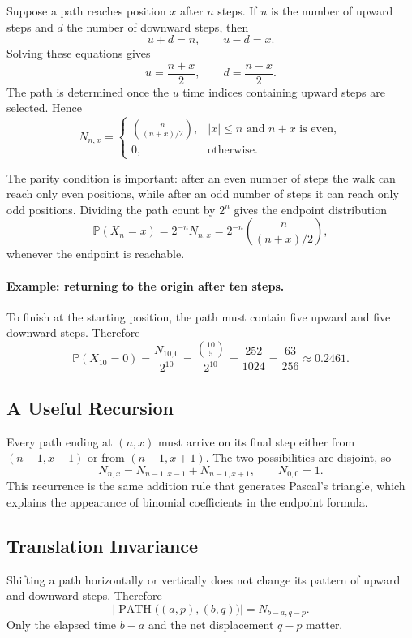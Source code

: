 \documentclass[12pt,openany]{book}
\theoremstyle{definition}
\theoremstyle{remark}
\begin{document}
Suppose a path reaches position \(x\) after \(n\) steps. If \(u\) is the
number of upward steps and \(d\) the number of downward steps, then
\[
u+d=n,
\qquad
u-d=x.
\]
Solving these equations gives
\[
u=\frac{n+x}{2},
\qquad
d=\frac{n-x}{2}.
\]
The path is determined once the \(u\) time indices containing upward steps
are selected. Hence
\[
N_{n,x}
=
\begin{cases}
\displaystyle \binom{n}{(n+x)/2},
& |x|\leq n\text{ and }n+x\text{ is even},\\[8pt]
0,
& \text{otherwise}.
\end{cases}
\]

The parity condition is important: after an even number of steps the walk
can reach only even positions, while after an odd number of steps it can
reach only odd positions. Dividing the path count by \(2^n\) gives the
endpoint distribution
\[
\boxed{
\mathbb{P}(X_n=x)
=2^{-n}N_{n,x}
=2^{-n}\binom{n}{(n+x)/2}
},
\]
whenever the endpoint is reachable.

\paragraph{Example: returning to the origin after ten steps.}
To finish at the starting position, the path must contain five upward and
five downward steps. Therefore
\[
\mathbb{P}(X_{10}=0)
=\frac{N_{10,0}}{2^{10}}
=\frac{\binom{10}{5}}{2^{10}}
=\frac{252}{1024}
=\frac{63}{256}
\approx0.2461.
\]

\subsection{A Useful Recursion}

Every path ending at \((n,x)\) must arrive on its final step either from
\((n-1,x-1)\) or from \((n-1,x+1)\). The two possibilities are disjoint, so
\[
N_{n,x}=N_{n-1,x-1}+N_{n-1,x+1},
\qquad N_{0,0}=1.
\]
This recurrence is the same addition rule that generates Pascal's triangle,
which explains the appearance of binomial coefficients in the endpoint
formula.

\subsection{Translation Invariance}

Shifting a path horizontally or vertically does not change its pattern of
upward and downward steps. Therefore
\[
\left|
\operatorname{PATH}\bigl((a,p),(b,q)\bigr)
\right|
=N_{b-a,q-p}.
\]
Only the elapsed time \(b-a\) and the net displacement \(q-p\) matter.
\end{document}
